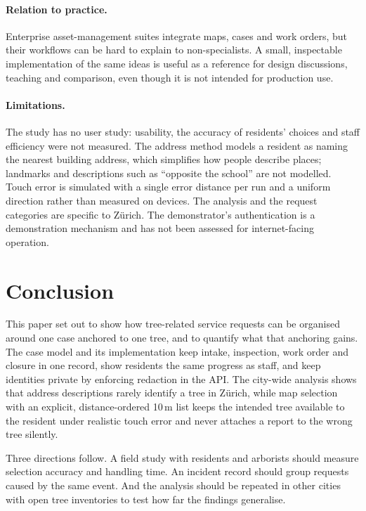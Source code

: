 \documentclass[11pt,a4paper]{article}
\begin{document}
\paragraph{Relation to practice.}
Enterprise asset-management suites integrate maps, cases and work orders, but their workflows can be hard to explain to non-specialists. A small, inspectable implementation of the same ideas is useful as a reference for design discussions, teaching and comparison, even though it is not intended for production use.

\paragraph{Limitations.}
The study has no user study: usability, the accuracy of residents' choices and staff efficiency were not measured. The address method models a resident as naming the nearest building address, which simplifies how people describe places; landmarks and descriptions such as ``opposite the school'' are not modelled. Touch error is simulated with a single error distance per run and a uniform direction rather than measured on devices. The analysis and the request categories are specific to Zürich. The demonstrator's authentication is a demonstration mechanism and has not been assessed for internet-facing operation.

\section{Conclusion}
\label{sec:conclusion}

This paper set out to show how tree-related service requests can be organised around one case anchored to one tree, and to quantify what that anchoring gains. The case model and its implementation keep intake, inspection, work order and closure in one record, show residents the same progress as staff, and keep identities private by enforcing redaction in the API. The city-wide analysis shows that address descriptions rarely identify a tree in Zürich, while map selection with an explicit, distance-ordered 10\,m list keeps the intended tree available to the resident under realistic touch error and never attaches a report to the wrong tree silently.

Three directions follow. A field study with residents and arborists should measure selection accuracy and handling time. An incident record should group requests caused by the same event. And the analysis should be repeated in other cities with open tree inventories to test how far the findings generalise.
\end{document}

